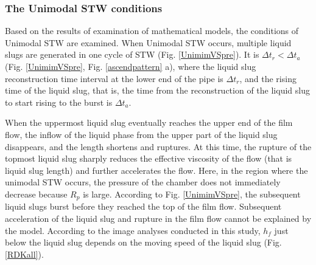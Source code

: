 \documentclass[aps,pre,preprint,groupedaddress,showkeys]{revtex4-2}
\begin{document}
\subsubsection{The Unimodal STW conditions}
Based on the results of examination of mathematical models, the conditions of Unimodal STW are examined.
When Unimodal STW occurs, multiple liquid slugs are generated in one cycle of STW (Fig. \ref{UnimimVSpre}).
It is $ \Delta t_r <\Delta t_a $ (Fig. \ref{UnimimVSpre}, Fig. \ref{ascendpattern} a), where the liquid slug reconstruction time interval at the lower end of the pipe is $ \Delta t_r $, and the rising time of the liquid slug, that is, the time from the reconstruction of the liquid slug to start rising to the burst is $ \Delta t_a$. 

When the uppermost liquid slug eventually reaches the upper end of the film flow, the inflow of the liquid phase from the upper part of the liquid slug disappears, and the length shortens and ruptures.
At this time, the rupture of the topmost liquid slug sharply reduces the effective viscosity of the flow (that is liquid slug length) and further accelerates the flow.
Here, in the region where the unimodal STW occurs, the pressure of the chamber does not immediately decrease because $ R_p $ is large.
According to Fig. \ref{UnimimVSpre}, the subsequent liquid slugs burst before they reached the top of the film flow.
Subsequent acceleration of the liquid slug and rupture in the film flow cannot be explained by the \cite{kanno 2018} model.
According to the image analyses conducted in this study, $ h_f $ just below the liquid slug depends on the moving speed of the liquid slug (Fig. \ref{RDKall}).
\end{document}
